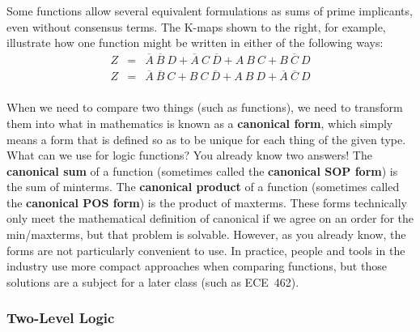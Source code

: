 \begin{minipage}{3.8in}
Some functions allow several equivalent formulations as
sums of prime implicants, even without consensus terms.  
The K-maps shown to the right, for example, illustrate 
how one function might be written in either of the following ways:
%
\begin{eqnarray*}
Z &=&
\overline{A}~\overline{B}~D +
\overline{A}~C~\overline{D} +
A~B~C +
B~\overline{C}~D\\
Z &=&
\overline{A}~\overline{B}~C +
B~C~\overline{D} +
A~B~D +
\overline{A}~\overline{C}~D\\
\end{eqnarray*}
\end{minipage}\hspace{.25in}%
\begin{minipage}{1.1in}
\vspace{12pt}
\end{minipage}\hspace{.25in}%
\begin{minipage}{1.1in}
\vspace{12pt}
\end{minipage}

When we need to compare two things (such as functions), we need to
transform them into what in mathematics is known as a {\bf canonical form},
which simply means a form that is defined so as to be unique 
for each thing of the given type.
What can we use for logic functions?  You already know two answers!  
%
The {\bf canonical sum} of a function (sometimes called the
{\bf canonical SOP form}) is the sum of minterms.  
%
The {\bf canonical product} of a function (sometimes called the
{\bf canonical POS form}) is the product of maxterms.  
%
These forms technically
only meet the mathematical definition of canonical if we agree on an order
for the min/maxterms, but that problem is solvable.
%
However, as you already know, the forms are not particularly 
convenient to use.  
%
In practice, people and tools in the industry use more compact 
approaches when comparing functions, but those solutions are a subject for
a later class (such as ECE~462).\\


\vfill

\subsubsection{Two-Level Logic}


